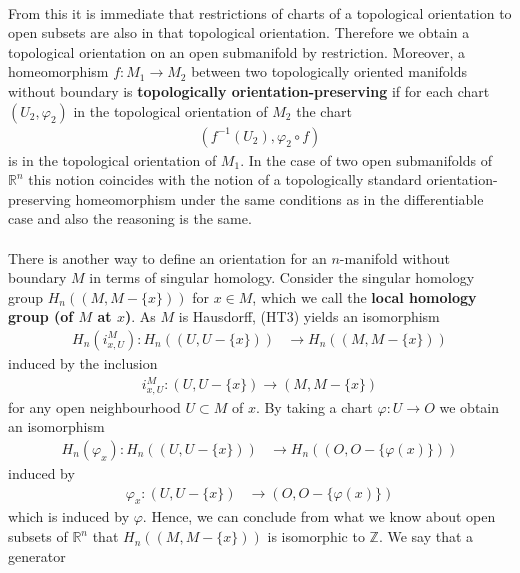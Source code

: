 \\
From this it is immediate that restrictions of charts of a topological orientation to open subsets are also in that topological orientation. Therefore we obtain a topological orientation on an open submanifold by restriction. Moreover, a homeomorphism $f \colon M_{1} \to M_{2}$ between two topologically oriented manifolds without boundary is \textbf{topologically orientation-preserving} if for each chart $(U_{2},\varphi_{2})$ in the topological orientation of $M_{2}$ the chart
\begin{align*}
  \left(
    f^{-1}(U_{2})
    ,
    \varphi_{2}
    \circ
    f
  \right)
\end{align*}
is in the topological orientation of $M_{1}$. In the case of two open submanifolds of $\mathbb{R}^{n}$ this notion coincides with the notion of a topologically standard orientation-preserving homeomorphism under the same conditions as in the differentiable case and also the reasoning is the same.
\\\\
There is another way to define an orientation for an $n$-manifold without boundary $M$ in terms of singular homology. Consider the singular homology group $H_{n}((M,M - \lbrace x \rbrace))$ for $x \in M$, which we call the \textbf{local homology group (of $M$ at $x$)}. As $M$ is Hausdorff, (HT3) yields an isomorphism
\begin{align*}
  H_{n}(i_{x,U}^{M})
  \colon
  H_{n}((U,U - \lbrace x \rbrace))
  &\to
  H_{n}((M,M - \lbrace x \rbrace))
\end{align*}
induced by the inclusion
\begin{align*}
  i_{x,U}^{M}
  \colon
  (U,U - \lbrace x \rbrace)
  \to
  (M,M - \lbrace x \rbrace)
\end{align*}
for any open neighbourhood $U \subset M$ of $x$. By taking a chart $\varphi \colon U \to O$ we obtain an isomorphism
\begin{align*}
  H_{n}(\varphi_{x})
  \colon
  H_{n}((U,U - \lbrace x \rbrace))
  &\to
  H_{n}((O,O - \lbrace \varphi(x) \rbrace))
\end{align*}
induced by
\begin{align*}
  \varphi_{x}
  \colon
  (U,U - \lbrace x \rbrace)
  &\to
  (O,O - \lbrace \varphi(x) \rbrace)
\end{align*}
which is induced by $\varphi$. Hence, we can conclude from what we know about open subsets of $\mathbb{R}^{n}$ that $H_{n}((M,M - \lbrace x \rbrace))$ is isomorphic to $\mathbb{Z}$. We say that a generator
